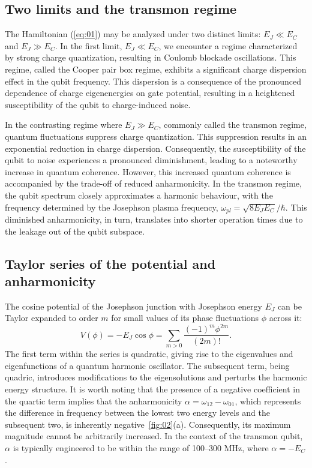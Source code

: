 \documentclass[lettersize,journal]{IEEEtran}
\begin{document}
\subsection{Two limits and the transmon regime}

The Hamiltonian (\ref{eq:01}) may be analyzed under two distinct limits: $E_J \ll E_C$ and $E_J \gg E_C$.
In the first limit, $E_J \ll E_C$, we encounter a regime characterized by strong charge quantization, resulting in Coulomb blockade oscillations. 
This regime, called the Cooper pair box regime, exhibits a significant charge dispersion effect in the qubit frequency. This dispersion is a consequence of the pronounced dependence of charge eigenenergies on gate potential, resulting in a heightened susceptibility of the qubit to charge-induced noise.

In the contrasting regime where $E_J \gg E_C$, commonly called the transmon regime, quantum fluctuations suppress charge quantization. 
This suppression results in an exponential reduction in charge dispersion. Consequently, the susceptibility of the qubit to noise experiences a pronounced diminishment, leading to a noteworthy increase in quantum coherence.
However, this increased quantum coherence is accompanied by the trade-off of reduced anharmonicity. 
In the transmon regime, the qubit spectrum closely approximates a harmonic behaviour, with the frequency determined by the Josephson plasma frequency, $\omega_{pl} = \sqrt{8 E_J E_C} / \hbar$.
This diminished anharmonicity, in turn, translates into shorter operation times due to the leakage out of the qubit subspace.

\subsection{Taylor series of the potential and anharmonicity}

The cosine potential of the Josephson junction with Josephson energy $E_J$ can be Taylor expanded to order $m$ for small values of its phase fluctuations $\phi$ across it:
\begin{equation} \label{eq:02}
   V(\phi) = - E_J \cos \phi = \sum_{m > 0} \frac{(-1)^{m} \phi^{2m}}{(2m)!}.
\end{equation}
The first term within the series is quadratic, giving rise to the eigenvalues and eigenfunctions of a quantum harmonic oscillator.
The subsequent term, being quadric, introduces modifications to the eigensolutions and perturbs the harmonic energy structure.
It is worth noting that the presence of a negative coefficient in the quartic term implies that the anharmonicity $\alpha = \omega_{12} - \omega_{01}$, which represents the difference in frequency between the lowest two energy levels and the subsequent two, is inherently negative~\ref{fig:02}(a). 
Consequently, its maximum magnitude cannot be arbitrarily increased. 
In the context of the transmon qubit, $\alpha$ is typically engineered to be within the range of 100–300 MHz, where $\alpha = -E_C$.
\end{document}
